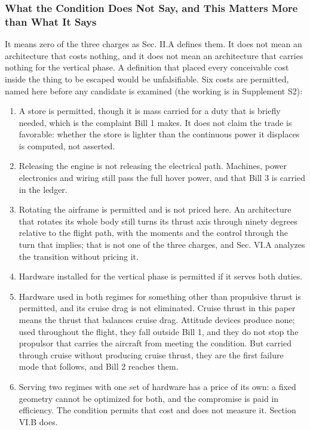 \documentclass[journal]{new-aiaa}
\begin{document}
\subsubsection{What the Condition Does Not Say, and This Matters More than What It Says}

It means zero of the three charges as Sec. II.A defines them. It does not mean an architecture that costs nothing, and it does not mean an architecture that carries nothing for the vertical phase. A definition that placed every conceivable cost inside the thing to be escaped would be unfalsifiable. Six costs are permitted, named here before any candidate is examined (the working is in Supplement S2):

\begin{enumerate}[label=\arabic*)]
\item A store is permitted, though it is mass carried for a duty that is briefly needed, which is the complaint Bill 1 makes. It does not claim the trade is favorable: whether the store is lighter than the continuous power it displaces is computed, not asserted.
\item Releasing the engine is not releasing the electrical path. Machines, power electronics and wiring still pass the full hover power, and that Bill 3 is carried in the ledger.
\item Rotating the airframe is permitted and is not priced here. An architecture that rotates its whole body still turns its thrust axis through ninety degrees relative to the flight path, with the moments and the control through the turn that implies; that is not one of the three charges, and Sec. VI.A analyzes the transition without pricing it.
\item Hardware installed for the vertical phase is permitted if it serves both duties.
\item Hardware used in both regimes for something other than propulsive thrust is permitted, and its cruise drag is not eliminated. Cruise thrust in this paper means the thrust that balances cruise drag. Attitude devices produce none; used throughout the flight, they fall outside Bill 1, and they do not stop the propulsor that carries the aircraft from meeting the condition. But carried through cruise without producing cruise thrust, they are the first failure mode that follows, and Bill 2 reaches them.
\item Serving two regimes with one set of hardware has a price of its own: a fixed geometry cannot be optimized for both, and the compromise is paid in efficiency. The condition permits that cost and does not measure it. Section VI.B does.
\end{enumerate}
\end{document}
